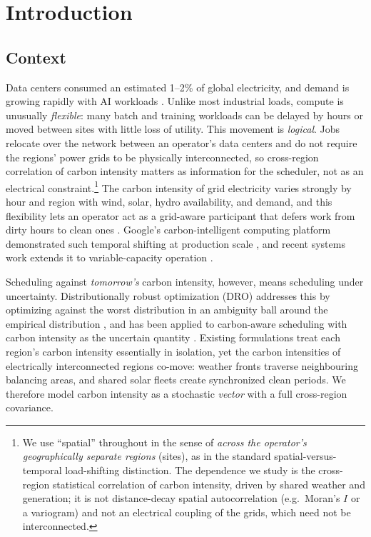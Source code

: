 \documentclass[12pt]{article}
\begin{document}

\section{Introduction}\label{sec:intro}

\subsection{Context}
Data centers consumed an estimated 1--2\% of global electricity, and demand is
growing rapidly with AI workloads \citep{iea2024}. Unlike most industrial loads,
compute is unusually \emph{flexible}: many batch and training workloads can be
delayed by hours or moved between sites with little loss of utility. This movement is
\emph{logical}. Jobs relocate over the network between an operator's data centers and
do not require the regions' power grids to be physically interconnected, so cross-region
correlation of carbon intensity matters as information for the scheduler, not
as an electrical constraint.\footnote{We use ``spatial'' throughout in the sense of
\emph{across the operator's geographically separate regions} (sites), as in the standard
spatial-versus-temporal load-shifting distinction. The dependence we study is the
cross-region statistical correlation of carbon intensity, driven by shared weather and
generation; it is not distance-decay spatial autocorrelation (e.g.\ Moran's $I$ or a
variogram) and not an electrical coupling of the grids, which need not be interconnected.}
The carbon intensity of grid electricity varies strongly
by hour and region with wind, solar, hydro availability, and demand, and this
flexibility lets an operator act as a grid-aware participant that defers work from dirty
hours to clean ones \citep{radovanovic2023,wiesner2021}. Google's carbon-intelligent
computing platform demonstrated such temporal shifting at production scale
\citep{radovanovic2023}, and recent systems work extends it to variable-capacity
operation \citep{wijayawardana2025}.

Scheduling against \emph{tomorrow's} carbon intensity, however, means scheduling
under uncertainty. Distributionally robust optimization (DRO) addresses this by
optimizing against the worst distribution in an ambiguity ball around the empirical
distribution \citep{esfahani2018}, and has been applied to carbon-aware scheduling
with carbon intensity as the uncertain quantity \citep{hall2024}. Existing
formulations treat each region's carbon intensity essentially in isolation, yet the
carbon intensities of electrically interconnected regions co-move: weather fronts
traverse neighbouring balancing areas, and shared solar fleets create synchronized
clean periods. We therefore model carbon intensity as a stochastic
\emph{vector} with a full cross-region covariance.
\end{document}
